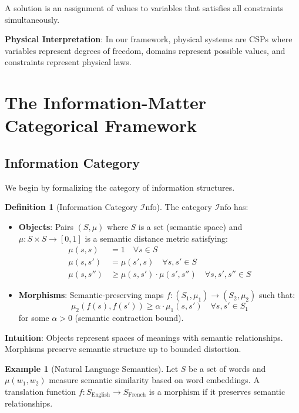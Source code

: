 \documentclass[11pt]{article}
\theoremstyle{definition}
\newtheorem{definition}{Definition}[section]
\newtheorem{example}{Example}[section]
\newcommand{\Info}{\mathcal{I}\text{nfo}}
\begin{document}
A solution is an assignment of values to variables that satisfies all constraints simultaneously.

\textbf{Physical Interpretation}: In our framework, physical systems are CSPs where variables represent degrees of freedom, domains represent possible values, and constraints represent physical laws.

\section{The Information-Matter Categorical Framework}

\subsection{Information Category}

We begin by formalizing the category of information structures.

\begin{definition}[Information Category $\Info$]
The category $\Info$ has:
\begin{itemize}
\item \textbf{Objects}: Pairs $(S, \mu)$ where $S$ is a set (semantic space) and $\mu: S \times S \to [0,1]$ is a semantic distance metric satisfying:
  \begin{align}
  \mu(s, s) &= 1 \quad \forall s \in S \tag{reflexivity}\\
  \mu(s, s') &= \mu(s', s) \quad \forall s, s' \in S \tag{symmetry}\\
  \mu(s, s'') &\geq \mu(s, s') \cdot \mu(s', s'') \quad \forall s, s', s'' \in S \tag{semantic transitivity}
  \end{align}
\item \textbf{Morphisms}: Semantic-preserving maps $f: (S_1, \mu_1) \to (S_2, \mu_2)$ such that:
  \begin{equation}
  \mu_2(f(s), f(s')) \geq \alpha \cdot \mu_1(s, s') \quad \forall s, s' \in S_1
  \end{equation}
  for some $\alpha > 0$ (semantic contraction bound).
\end{itemize}
\end{definition}

\textbf{Intuition}: Objects represent spaces of meanings with semantic relationships. Morphisms preserve semantic structure up to bounded distortion.

\begin{example}[Natural Language Semantics]
Let $S$ be a set of words and $\mu(w_1, w_2)$ measure semantic similarity based on word embeddings. A translation function $f: S_{\text{English}} \to S_{\text{French}}$ is a morphism if it preserves semantic relationships.
\end{example}
\end{document}
